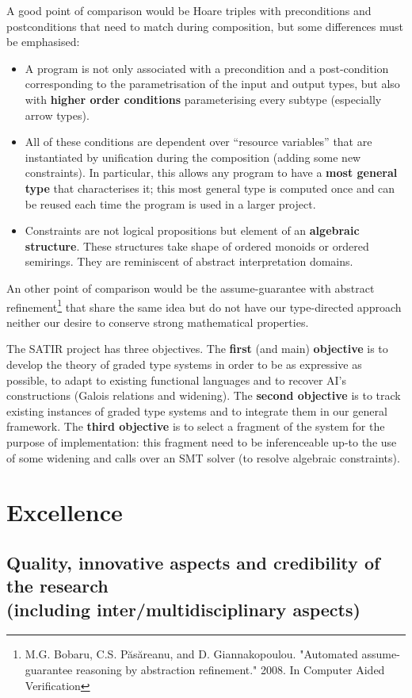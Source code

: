 \documentclass{article}[11pt]
\begin{document}
A good point of comparison would be Hoare triples with preconditions and postconditions that need to match during composition, but some differences must be emphasised:
\begin{itemize}
\item A program is not only associated with a precondition and a post-condition corresponding to the parametrisation of the input and output types, but also with {\bf higher order conditions} parameterising every subtype (especially arrow types).
\item All of these conditions are dependent over ``resource variables'' that are instantiated by unification during the composition (adding some new constraints). In particular, this allows any program to have a {\bf most general type} that characterises it; this most general type is computed once and can be reused each time the program is used in a larger project.
\item Constraints are not logical propositions but element of an {\bf algebraic structure}. These structures take shape of ordered monoids or ordered semirings. They are reminiscent of abstract interpretation domains.
\end{itemize}
An other point of comparison would be the assume-guarantee with abstract refinement\footnote{M.G. Bobaru, C.S. Păsăreanu, and D. Giannakopoulou. "Automated assume-guarantee reasoning by abstraction refinement." 2008. In Computer Aided Verification} that share the same idea but do not have our type-directed approach neither our desire to conserve strong mathematical properties.

The SATIR project has three objectives. The {\bf first} (and main) {\bf objective} is to develop the theory of graded type systems in order to be as expressive as possible, to adapt to existing functional languages and to recover AI's constructions (Galois relations and widening). The {\bf second objective} is to track existing instances of graded type systems and to integrate them in our general framework. The {\bf third objective} is to select a fragment of the system for the purpose of implementation: this fragment need to be inferenceable up-to the use of some widening and calls over an SMT solver (to resolve algebraic constraints).

\section{Excellence}
\subsection{Quality, innovative aspects and credibility of the research\\  (including inter/multidisciplinary aspects)}
\end{document}
